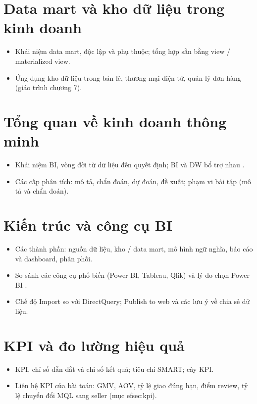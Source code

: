 \section{Data mart và kho dữ liệu trong kinh doanh}
\begin{itemize}
  \item Khái niệm data mart, độc lập và phụ thuộc; tổng hợp sẵn bằng view / materialized view.
  \item Ứng dụng kho dữ liệu trong bán lẻ, thương mại điện tử, quản lý đơn hàng (giáo trình chương 7).
\end{itemize}


\section{Tổng quan về kinh doanh thông minh}
\begin{itemize}
  \item Khái niệm BI, vòng đời từ dữ liệu đến quyết định; BI và DW bổ trợ nhau \cite{kimball2013}.
  \item Các cấp phân tích: mô tả, chẩn đoán, dự đoán, đề xuất; phạm vi bài tập (mô tả và chẩn đoán).
\end{itemize}

\section{Kiến trúc và công cụ BI}
\begin{itemize}
  \item Các thành phần: nguồn dữ liệu, kho / data mart, mô hình ngữ nghĩa, báo cáo và dashboard, phân phối.
  \item So sánh các công cụ phổ biến (Power BI, Tableau, Qlik) và lý do chọn Power BI \cite{powerbi_docs}.
  \item Chế độ Import so với DirectQuery; Publish to web và các lưu ý về chia sẻ dữ liệu.
\end{itemize}

\section{KPI và đo lường hiệu quả}
\begin{itemize}
  \item KPI, chỉ số dẫn dắt và chỉ số kết quả; tiêu chí SMART; cây KPI.
  \item Liên hệ KPI của bài toán: GMV, AOV, tỷ lệ giao đúng hạn, điểm review, tỷ lệ chuyển đổi MQL sang seller (mục 
ef{sec:kpi}).
\end{itemize}

